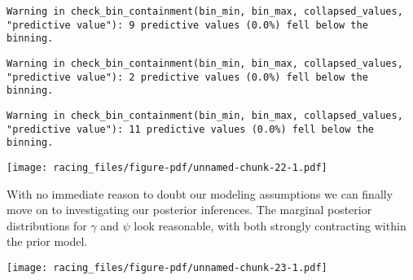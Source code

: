 \documentclass[
  letterpaper,
  DIV=11,
  numbers=noendperiod]{scrartcl}
\newenvironment{Shaded}{\begin{snugshade}}{\end{snugshade}}
\newcommand{\AttributeTok}[1]{\textcolor[rgb]{0.40,0.45,0.13}{#1}}
\newcommand{\DecValTok}[1]{\textcolor[rgb]{0.68,0.00,0.00}{#1}}
\newcommand{\FunctionTok}[1]{\textcolor[rgb]{0.28,0.35,0.67}{#1}}
\newcommand{\NormalTok}[1]{\textcolor[rgb]{0.00,0.23,0.31}{#1}}
\newcommand{\SpecialCharTok}[1]{\textcolor[rgb]{0.37,0.37,0.37}{#1}}
\newcommand{\StringTok}[1]{\textcolor[rgb]{0.13,0.47,0.30}{#1}}
\begin{document}
\begin{verbatim}
Warning in check_bin_containment(bin_min, bin_max, collapsed_values,
"predictive value"): 9 predictive values (0.0%) fell below the binning.
\end{verbatim}

\begin{verbatim}
Warning in check_bin_containment(bin_min, bin_max, collapsed_values,
"predictive value"): 2 predictive values (0.0%) fell below the binning.
\end{verbatim}

\begin{verbatim}
Warning in check_bin_containment(bin_min, bin_max, collapsed_values,
"predictive value"): 11 predictive values (0.0%) fell below the binning.
\end{verbatim}

\texttt{[image: racing\_files/figure-pdf/unnamed-chunk-22-1.pdf]}

With no immediate reason to doubt our modeling assumptions we can
finally move on to investigating our posterior inferences. The marginal
posterior distributions for \(\gamma\) and \(\psi\) look reasonable,
with both strongly contracting within the prior model.

\begin{Shaded}
\end{Shaded}

\texttt{[image: racing\_files/figure-pdf/unnamed-chunk-23-1.pdf]}
\end{document}
